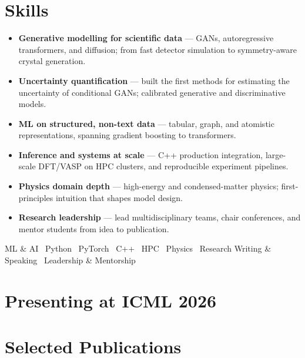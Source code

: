 \documentclass[11pt,a4paper]{article}
\begin{document}
\newpage

\section{Skills}
\begin{itemize}
  \item \textbf{Generative modelling for scientific data} --- GANs, autoregressive transformers, and diffusion; from fast detector simulation to symmetry-aware crystal generation.
  \item \textbf{Uncertainty quantification} --- built the first methods for estimating the uncertainty of conditional GANs; calibrated generative and discriminative models.
  \item \textbf{ML on structured, non-text data} --- tabular, graph, and atomistic representations, spanning gradient boosting to transformers.
  \item \textbf{Inference and systems at scale} --- C++ production integration, large-scale DFT/VASP on HPC clusters, and reproducible experiment pipelines.
  \item \textbf{Physics domain depth} --- high-energy and condensed-matter physics; first-principles intuition that shapes model design.
  \item \textbf{Research leadership} --- lead multidisciplinary teams, chair conferences, and mentor students from idea to publication.
\end{itemize}
{\small\centering ML \& AI \textbullet\ Python \textbullet\ PyTorch \textbullet\ C++ \textbullet\ HPC \textbullet\ Physics \textbullet\ Research Writing \& Speaking \textbullet\ Leadership \& Mentorship\par}

\nocite{*}
\section{Presenting at ICML 2026}
\printbibliography[filter=cvicml,heading=none,resetnumbers=true]

\section{Selected Publications}
\printbibliography[filter=cvselected,heading=none,resetnumbers=true]
\end{document}
